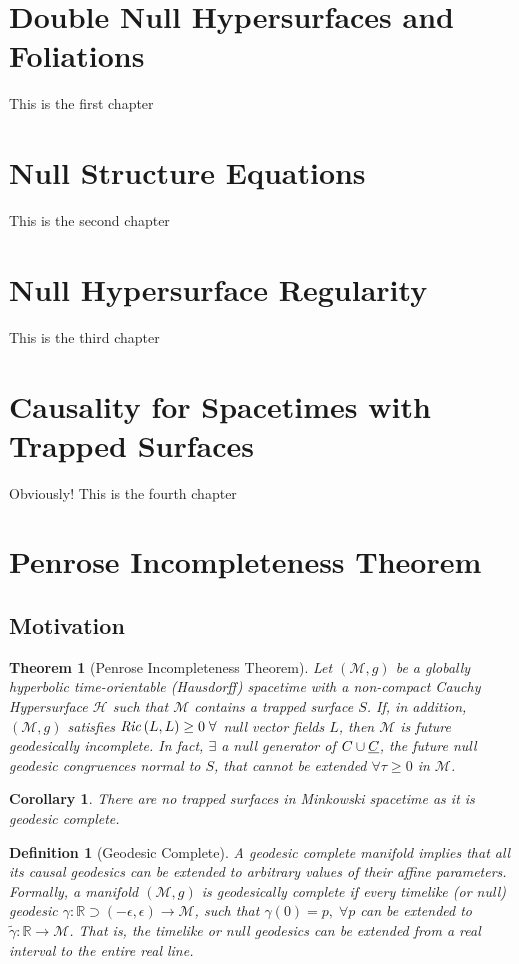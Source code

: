 \documentclass[11pt, a4paper]{report}
\theoremstyle{bfnote}
\newtheorem{theorem}{Theorem}[section]
\newtheorem{corollary}{Corollary}[theorem]
\newtheorem{definition}{Definition}
\begin{document}
\section{Double Null Hypersurfaces and Foliations}
This is the first chapter

\section{Null Structure Equations}
This is the second chapter

\section{Null Hypersurface Regularity}
This is the third chapter

\section{Causality for Spacetimes with Trapped Surfaces}
Obviously! This is the fourth chapter

\section{Penrose Incompleteness Theorem}
\subsection{Motivation}
\begin{theorem}[Penrose Incompleteness Theorem]
Let $\left(\mathcal{M}, g\right)$ be a globally hyperbolic
time-orientable (Hausdorff) spacetime with a non-compact Cauchy Hypersurface
$\mathcal{H}$ such that $\mathcal{M}$ contains a trapped surface $S$. If, in
addition, $\left(\mathcal{M}, g\right)$ satisfies $\text{\textit{Ric}}\left(L,
L\right) \geq 0 \;\forall$ null vector fields $L$, then $\mathcal{M}$ is future
geodesically incomplete. In fact, $\exists$ a null generator of $C \cup
\underbar{$C$}$, the future null geodesic congruences normal to $S$, that cannot
be extended $\forall \tau \geq 0$ in $\mathcal{M}$.
\end{theorem}

\begin{corollary}{\label{MinkGeodcomplete}} 
    There are no trapped surfaces in Minkowski spacetime as it is geodesic complete.
\end{corollary}

\begin{definition}[Geodesic Complete]
    A geodesic complete manifold implies that all its causal geodesics can be
    extended to arbitrary values of their affine parameters. Formally, a
    manifold $\left(\mathcal{M}, g\right)$ is geodesically complete if every
    timelike (or null) geodesic $\gamma : \mathbb{R}\supset \left(-\epsilon,
    \epsilon\right) \to \mathcal{M}$, such that $\gamma\left(0\right) = p,
    \;\forall p$ can be extended to $\widetilde{\gamma} : \mathbb{R} \to
    \mathcal{M}$. That is, the timelike or null geodesics can be extended from a
    real interval to the entire real line.
\end{definition}
\end{document}
